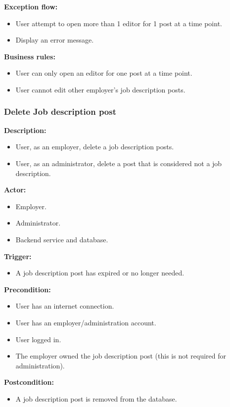 \documentclass[a4paper]{article}
\begin{document}
\textbf{Exception flow:}
\begin{itemize}
    \item User attempt to open more than 1 editor for 1 post at a time point.
    \item Display an error message.
\end{itemize}

\textbf{Business rules:}
\begin{itemize}
    \item User can only open an editor for one post at a time point.
    \item User cannot edit other employer's job description posts.
\end{itemize}

\subsubsection{Delete Job description post}
\textbf{Description:}
\begin{itemize}
    \item User, as an employer, delete a job description posts.
    \item User, as an administrator, delete a post that is considered not a job description.
\end{itemize}

\textbf{Actor:}
\begin{itemize}
    \item Employer.
    \item Administrator.
    \item Backend service and database.
\end{itemize}

\textbf{Trigger:}
\begin{itemize}
    \item A job description post has expired or no longer needed.
\end{itemize}

\textbf{Precondition:}
\begin{itemize}
    \item User has an internet connection.
    \item User has an employer/administration account.
    \item User logged in.
    \item The employer owned the job description post (this is not required for administration).
\end{itemize}

\textbf{Postcondition:}
\begin{itemize}
    \item A job description post is removed from the database.
\end{itemize}
\end{document}
